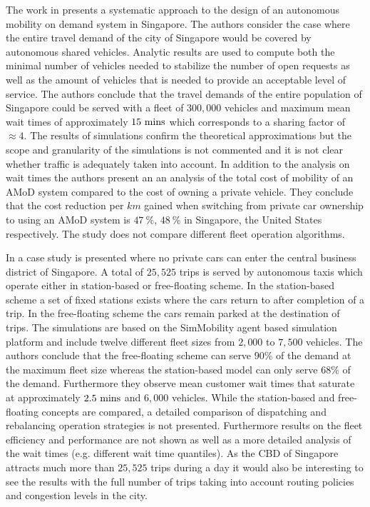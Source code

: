 The work in \cite{spieser2014toward} presents a systematic approach to the design of an autonomous mobility on demand system in Singapore. The authors consider the case where the entire travel demand of the city of Singapore would be covered by autonomous shared vehicles. Analytic results are used to compute both the minimal number of vehicles needed to stabilize the number of open requests as well as the amount of vehicles that is needed to provide an acceptable level of service. The authors conclude that the travel demands of the entire population of Singapore could be served with a fleet of $300,000$ vehicles and maximum mean wait times of approximately $15~ \textnormal{mins}$ which corresponds to a sharing factor of $\approx 4$. The results of simulations confirm the theoretical approximations but the scope and granularity of the simulations is not commented and it is not clear whether traffic is adequately taken into account. In addition to the analysis on wait times the authors present an an analysis of the total cost of mobility of an AMoD system compared to the cost of owning a private vehicle. They conclude that the cost reduction per $km$ gained when switching from private car ownership to using an AMoD system is $47~ \%$, $48~ \%$ in Singapore, the United States respectively. The study does not compare different fleet operation algorithms.

In \cite{marczuk2015autonomous} a case study is presented where no private cars can enter the central business district of Singapore. A total of $25,525$ trips is served by autonomous taxis which operate either in station-based or free-floating scheme. In the station-based scheme a set of fixed stations exists where the cars return to after completion of a trip. In the free-floating scheme the cars remain parked at the destination of trips. The simulations are based on the SimMobility agent based simulation platform and include twelve different fleet sizes from $2,000$ to $7,500$ vehicles. The authors conclude that the free-floating scheme can serve $90\%$ of the demand at the maximum fleet size whereas the station-based model can only serve $68 \% $ of the demand. Furthermore they observe mean customer wait times that saturate at approximately $2.5 ~ \textnormal{mins}$ and $6,000$ vehicles. While the station-based and free-floating concepts are compared, a detailed comparison of dispatching and rebalancing operation strategies is not presented. Furthermore results on the fleet efficiency and performance are not shown as well as a more detailed analysis of the wait times (e.g. different wait time quantiles). As the CBD of Singapore attracts much more than $25,525$ trips during a day it would also be interesting to see the results with the full number of trips taking into account routing policies and congestion levels in the city.

